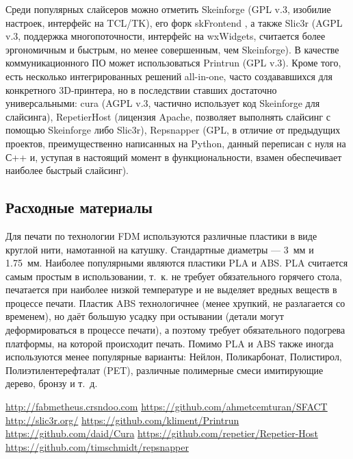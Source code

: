 \documentclass[10pt, a5paper]{article}
\begin{document}
Среди популярных слайсеров можно отметить Skeinforge \cite{skeinforge} \linebreak (GPL v.3, изобилие настроек, интерфейс на TCL/TK), его форк skFrontend \cite{sfact}, а также Slic3r \cite{slic3r} (AGPL v.3, поддержка многопоточности, интерфейс на wxWidgets, считается более эргономичным и быстрым, но менее совершенным, чем Skeinforge). В качестве коммуникационного ПО может использоваться Printrun \cite{printrun} (GPL v.3). Кроме того, есть несколько интегрированных решений all-in-one, часто создававшихся для конкретного 3D-принтера, но в последствии ставших достаточно универсальными: cura \cite{cura} (AGPL v.3, частично использует код Skeinforge для слайсинга), RepetierHost \cite{RepetierHost} (лицензия Apache, позволяет выполнять слайсинг с помощью Skeinforge либо Slic3r), Repsnapper \cite{repsnapper} (GPL, в отличие от предыдущих проектов, преимущественно написанных на Python, данный переписан с нуля на С++ и, уступая в настоящий момент в функциональности, взамен обеспечивает наиболее быстрый слайсинг).


\subsection*{Расходные материалы}

Для печати по технологии FDM используются различные пластики в виде круглой нити, намотанной на катушку. Стандартные диаметры --- 3~мм и 1.75~мм. Наиболее популярными являются пластики PLA и ABS. PLA считается самым простым в использовании, т.~к. не требует обязательного горячего стола, печатается при наиболее низкой температуре и не выделяет вредных веществ в процессе печати. Пластик ABS технологичнее (менее хрупкий, не разлагается со временем), но даёт большую усадку при остывании (детали могут деформироваться в процессе печати), а поэтому требует обязательного подогрева платформы, на которой происходит печать. Помимо PLA и ABS также иногда используются менее популярные варианты: Нейлон, Поликарбонат, Полистирол, Полиэтилентерефталат (PET), различные полимерные смеси имитирующие дерево, бронзу и т.~д.

\begin{thebibliography}{9}
 \url{http://fabmetheus.crsndoo.com}
 \url{https://github.com/ahmetcemturan/SFACT}
 \url{http://slic3r.org/}
 \url{https://github.com/kliment/Printrun}
 \url{https://github.com/daid/Cura}
 \url{https://github.com/repetier/Repetier-Host}
 \url{https://github.com/timschmidt/repsnapper}
\end{thebibliography}
\end{document}
